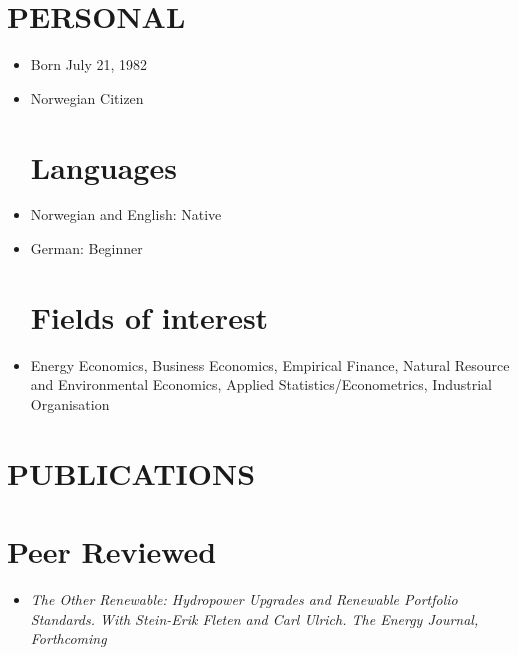 \documentclass[margin]{res}
\begin{document}
  

\address{BI Campus Trondheim \\Postboks 1254, Sluppen
7462 Trondheim \\ mob:  +47 98 25 16 75 \\ email: johannes.mauritzen@bi.no \\
website:  \url{jmaurit.github.io}}
                           
                        
\begin{resume} 
\section{PERSONAL}
\begin{itemize} 
\item[] Born July 21, 1982
\item[] Norwegian Citizen

\normalsize{\section{Languages}}
\item[] Norwegian and English: Native
\item[] German: Beginner 

\normalsize{\section{Fields of interest}}
\item[] Energy Economics, Business Economics, Empirical Finance, Natural Resource and Environmental Economics, Applied Statistics/Econometrics, Industrial Organisation
\end{itemize}


\section{PUBLICATIONS}       

\normalsize{\section{Peer Reviewed}}
\begin{itemize}
\setlength{\itemsep}{10pt}

\item[] \emph{The Other Renewable: Hydropower Upgrades and Renewable Portfolio Standards. With Stein-Erik Fleten and Carl Ulrich. The Energy Journal, Forthcoming}


\end{itemize}
\end{resume}
\end{document}
